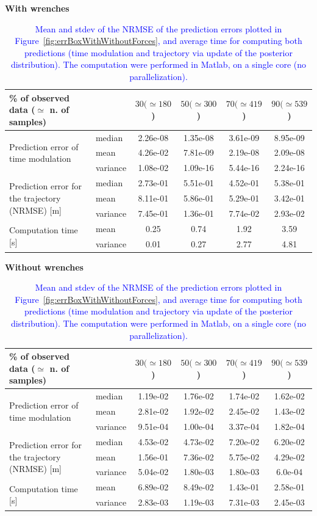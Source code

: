 \documentclass[utf8]{frontiersSCNS} %
\newcommand{\rev}[1]{\textcolor{blue}{#1}}
\begin{document}
\begin{table}
\begin{center}
\color{blue}
\textbf{With wrenches}
\begin{tabular}{|p{3.6cm}|p{2cm}|c|c|c|c|}
  \hline 
   \% of observed data ($\simeq$ n. of samples) &  & \textbf{$30 (\simeq 180$)} & \textbf{$50 (\simeq 300$)} & \textbf{$70 (\simeq 419$)} & \textbf{$90 (\simeq 539$)}  \tabularnewline
  \hline
\multirow{3}{3cm}{Prediction error of time modulation} &  median& 2.26e-08 & 1.35e-08 & 3.61e-09 & 8.95e-09 \tabularnewline
  \cline{2-6} & mean & 4.26e-02 & 7.81e-09 & 2.19e-08 & 2.09e-08 \tabularnewline
 \cline{2-6} & variance & 1.08e-02 & 1.09e-16 & 5.44e-16 & 2.24e-16 \tabularnewline
  \hline
\multirow{3}{3cm}{Prediction error for the trajectory (NRMSE) [m]} &  median& 2.73e-01 & 5.51e-01 & 4.52e-01 & 5.38e-01 \tabularnewline
  \cline{2-6} & mean & 8.11e-01 & 5.86e-01 & 5.29e-01 & 3.42e-01 \tabularnewline
 \cline{2-6} & variance & 7.45e-01 & 1.36e-01 & 7.74e-02 & 2.93e-02 \tabularnewline
  \hline  
\multirow{2}{3cm}{Computation time [s]} &  mean & 0.25 & 0.74 & 1.92 & 3.59 \tabularnewline
 \cline{2-6} & variance & 0.01 & 0.27 & 2.77 & 4.81 \tabularnewline
 \hline
\end{tabular}

\vspace{0.4cm}
\textbf{Without wrenches}
\begin{tabular}{|p{3.6cm}|p{2cm}|c|c|c|c|}
  \hline 
   \% of observed data ($\simeq$ n. of samples) &  & \textbf{$30 (\simeq 180$)} & \textbf{$50 (\simeq 300$)} & \textbf{$70 (\simeq 419$)} & \textbf{$90 (\simeq 539$)}  \tabularnewline
  \hline
\multirow{3}{3cm}{Prediction error of time modulation} &  median& 1.19e-02 & 1.76e-02 & 1.74e-02 & 1.62e-02 \tabularnewline
  \cline{2-6} & mean & 2.81e-02 & 1.92e-02 & 2.45e-02 & 1.43e-02 \tabularnewline
 \cline{2-6} & variance & 9.51e-04 & 1.00e-04 & 3.37e-04 & 1.82e-04 \tabularnewline
  \hline
\multirow{3}{3cm}{Prediction error for the trajectory (NRMSE) [m]} &  median& 4.53e-02 & 4.73e-02 & 7.20e-02 & 6.20e-02 \tabularnewline
  \cline{2-6} & mean & 1.56e-01 & 7.36e-02 & 5.75e-02 & 4.29e-02 \tabularnewline
 \cline{2-6} & variance & 5.04e-02 & 1.80e-03 & 1.80e-03 & 6.0e-04 \tabularnewline
  \hline  
\multirow{2}{3cm}{Computation time [s]} &  mean & 6.89e-02 & 8.49e-02 & 1.43e-01 & 2.58e-01 \tabularnewline
 \cline{2-6} & variance & 2.83e-03 & 1.19e-03 & 7.31e-03 & 2.45e-03 \tabularnewline
 \hline
\end{tabular}
\end{center}
\caption{\rev{Mean and stdev of the NRMSE of the prediction errors plotted in Figure~\ref{fig:errBoxWithWithoutForces}, and average time for computing both predictions (time modulation and trajectory via update of the posterior distribution). The computation were performed in Matlab, on a single core (no parallelization).}}
\normalcolor
\label{table:statsError}
\end{table}
\end{document}
